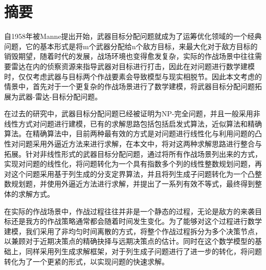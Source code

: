 \maketitle%
\MAKETITLE%
\makedeclaration%
\intobmk\chapter*{摘\quad 要}%
\setcounter{page}{1}%

自1958年被Manne提出开始，武器目标分配问题就成为了运筹优化领域的一个经典问题，它的基本形式是将m个武器分配给n个敌方目标，来最大化对于敌方目标的销毁期望，随着时代的发展，战场环境也变得愈发复杂，实际的作战场景中往往需要雷达在内的侦察资源来指导武器对目标进行打击，因此在对问题进行数学建模时，仅仅考虑武器与目标两个作战要素会导致模型与现实相脱节。因此本文考虑的情景中，首先对于一个更复杂的作战场景进行了数学建模，将武器目标分配问题拓展为武器-雷达-目标分配问题。

在过去的研究中，武器目标分配问题已经被证明为NP-完全问题，并且一般采用非线性方式对问题进行建模，已有的求解思路包括包括启发式算法，近似算法和精确算法。在精确算法中，目前两种最有效的方式是对问题进行线性化与利用问题的凸性对问题采用外逼近方法来进行求解，在本文中，将对这两种求解思路进行整合与拓展。针对非线性形式的武器目标分配问题，通过将所有作战场景列出来的方式，实现对问题的线性化，将问题转化为一个具有指数多个列的线性整数规划问题，再对这个问题采用基于列生成的分支定界算法，并且将列生成子问题转化为一个凸整数规划题，并使用外逼近方法进行求解，并提出了一系列有效不等式，最终得到整体的求解方式。

在实际的作战场景中，作战过程往往并非是一个静态的过程，无论是敌方的来袭目标还是我方的作战策略通常都会随着时间发生变化。为了能够对这个过程进行数学建模，我们采用了非均匀时间离散的方式，将整个作战过程拆分为多个决策节点，以兼顾对于近期决策点的精确抉择与远期决策点的估计。同时在这个数学模型的基础上，同样采用列生成求解框架，对于列生成子问题进行了进一步的转化，将问题转化为了一个更紧的形式，以实现问题的快速求解。





